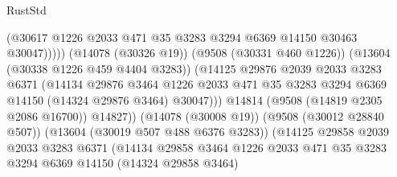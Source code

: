 \begin{lexlean}{RustStd}
\begin{coremodule}
                                          (@30617
                                            @1226
                                            @2033
                                            @471
                                            @35
                                            @3283
                                            @3294
                                            @6369
                                            @14150
                                            @30463
                                            @30047)))))
                                  (@14078 (@30326 @19))
                                  (@9508 (@30331 @460 @1226))
                                  (@13604 (@30338 @1226 @459 @4404 @3283))
                                  (@14125
                                    @29876
                                    @2039
                                    @2033
                                    @3283
                                    @6371
                                    (@14134
                                      @29876
                                      @3464
                                      @1226
                                      @2033
                                      @471
                                      @35
                                      @3283
                                      @3294
                                      @6369
                                      @14150
                                      (@14324 @29876 @3464)
                                      @30047)))
                                @14814
                                (@9508 (@14819 @2305 @2086 @16700))
                                @14827))
                            (@14078 (@30008 @19))
                            (@9508 (@30012 @28840 @507))
                            (@13604 (@30019 @507 @488 @6376 @3283))
                            (@14125
                              @29858
                              @2039
                              @2033
                              @3283
                              @6371
                              (@14134
                                @29858
                                @3464
                                @1226
                                @2033
                                @471
                                @35
                                @3283
                                @3294
                                @6369
                                @14150
                                (@14324 @29858 @3464)

\end{coremodule}
\end{lexlean}
